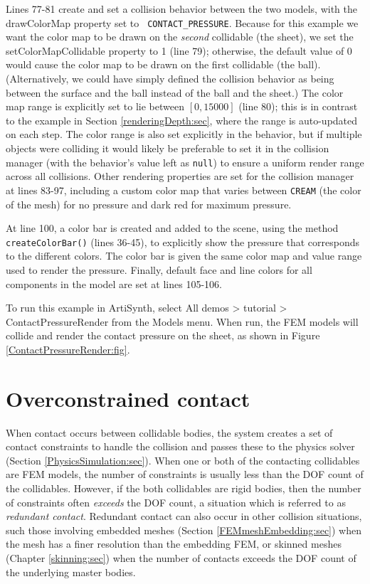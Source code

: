 Lines 77-81 create and set a collision behavior between the two
models, with the {\sf drawColorMap} property set to {\tt
CONTACT\_PRESSURE}. Because for this example we want the color map to
be drawn on the {\it second} collidable (the sheet), we set the {\sf
setColorMapCollidable} property to 1 (line 79); otherwise, the default
value of 0 would cause the color map to be drawn on the first
collidable (the ball). (Alternatively, we could have simply defined
the collision behavior as being between the surface and the ball
instead of the ball and the sheet.) The color map range is explicitly
set to lie between $[0, 15000]$ (line 80); this is in contrast to the
example in Section \ref{renderingDepth:sec}, where the range is
auto-updated on each step. The color range is also set explicitly in
the behavior, but if multiple objects were colliding it would likely
be preferable to set it in the collision manager (with the behavior's
value left as {\tt null}) to ensure a uniform render range across all
collisions.  Other rendering properties are set for the collision
manager at lines 83-97, including a custom color map that varies
between {\tt CREAM} (the color of the mesh) for no pressure and dark
red for maximum pressure.

At line 100, a color bar is created and added to the scene, using the
method {\tt createColorBar()} (lines 36-45), to explicitly show the
pressure that corresponds to the different colors. The color bar is
given the same color map and value range used to render the
pressure. Finally, default face and line colors for all components in
the model are set at lines 105-106.

To run this example in ArtiSynth, select {\sf All demos > tutorial >
ContactPressureRender} from the {\sf Models} menu. When run, the FEM
models will collide and render the contact pressure on the sheet, as
shown in Figure \ref{ContactPressureRender:fig}.

\section{Overconstrained contact}
\label{OverconstrainedContact:sec}

When contact occurs between collidable bodies, the system creates a
set of contact constraints to handle the collision and passes these to
the physics solver (Section \ref{PhysicsSimulation:sec}).  When one or
both of the contacting collidables are FEM models, the number of
constraints is usually less than the DOF count of the collidables.
However, if the both collidables are rigid bodies, then the number of
constraints often {\it exceeds} the DOF count, a situation which is
referred to as {\it redundant contact}. Redundant contact can also
occur in other collision situations, such those involving embedded
meshes (Section \ref{FEMmeshEmbedding:sec}) when the mesh has a finer
resolution than the embedding FEM, or skinned meshes
(Chapter \ref{skinning:sec}) when the number of contacts exceeds the
DOF count of the underlying master bodies.

